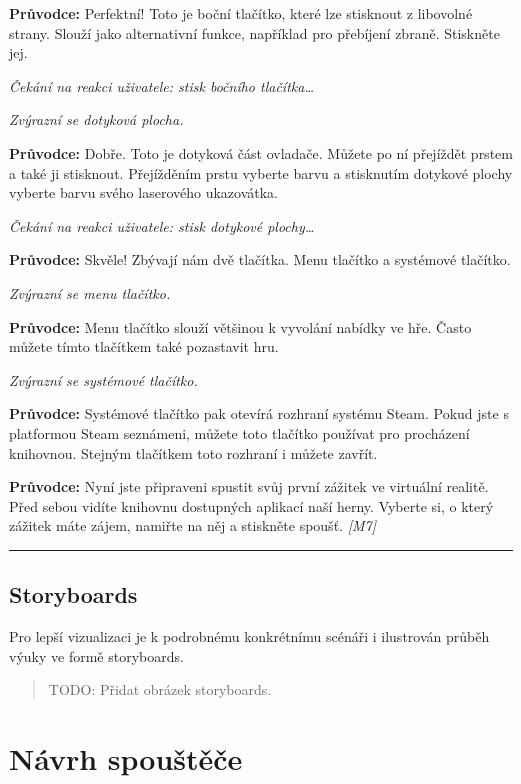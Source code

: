 \textbf{Průvodce:} Perfektní! Toto je boční tlačítko, které lze
stisknout z libovolné strany. Slouží jako alternativní funkce, například
pro přebíjení zbraně. Stiskněte jej.

\emph{Čekání na reakci uživatele: stisk bočního tlačítka\ldots{}}

\emph{Zvýrazní se dotyková plocha.}

\textbf{Průvodce:} Dobře. Toto je dotyková část ovladače. Můžete po ní
přejíždět prstem a také ji stisknout. Přejížděním prstu vyberte barvu a
stisknutím dotykové plochy vyberte barvu svého laserového ukazovátka.

\emph{Čekání na reakci uživatele: stisk dotykové plochy\ldots{}}

\textbf{Průvodce:} Skvěle! Zbývají nám dvě tlačítka. Menu tlačítko a
systémové tlačítko.

\emph{Zvýrazní se menu tlačítko.}

\textbf{Průvodce:} Menu tlačítko slouží většinou k vyvolání nabídky ve
hře. Často můžete tímto tlačítkem také pozastavit hru.

\emph{Zvýrazní se systémové tlačítko.}

\textbf{Průvodce:} Systémové tlačítko pak otevírá rozhraní systému
Steam. Pokud jste s platformou Steam seznámeni, můžete toto tlačítko
používat pro procházení knihovnou. Stejným tlačítkem toto rozhraní i
můžete zavřít.

\textbf{Průvodce:} Nyní jste připraveni spustit svůj první zážitek ve
virtuální realitě. Před sebou vidíte knihovnu dostupných aplikací naší
herny. Vyberte si, o který zážitek máte zájem, namiřte na něj a
stiskněte spoušť. \emph{{[}M7{]}}

\begin{center}\rule{0.5\linewidth}{\linethickness}\end{center}

\subsection{Storyboards}\label{storyboards}

Pro lepší vizualizaci je k podrobnému konkrétnímu scénáři i ilustrován
průběh výuky ve formě storyboards.

\begin{quote}
TODO: Přidat obrázek storyboards.
\end{quote}

\section{Návrh spouštěče}\label{nuxe1vrh-spouux161tux11bux10de}

